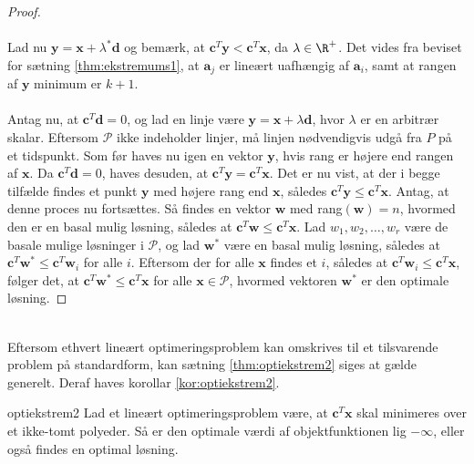 \begin{proof}
\\\\%
Lad nu $\textbf{y} = \textbf{x} + \lambda^* \textbf{d} $ og bemærk, at $ \textbf{c}^T \textbf{y} < \textbf{c}^T \textbf{x}$, da $ \lambda \in \R^+ $. 
Det vides fra beviset for sætning \ref{thm:ekstremums1}, at $\textbf{a}_j$ er lineært uafhængig af $\textbf{a}_i$, samt at rangen af $\textbf{y}$ minimum er $k + 1$. 
\\\\
%
Antag nu, at $\textbf{c}^T \textbf{d} = 0$, og lad en linje være $\textbf{y} = \textbf{x} + \lambda \textbf{d}$, hvor $ \lambda $ er en arbitrær skalar. 
Eftersom $\mathcal{P}$ ikke indeholder linjer, må linjen nødvendigvis udgå fra $P$ på et tidspunkt. 
Som før haves nu igen en vektor $\textbf{y}$, hvis rang er højere end rangen af $\textbf{x}$. 
Da $\textbf{c}^T \textbf{d} = 0$, haves desuden, at $\textbf{c}^T \textbf{y} = \textbf{c}^T \textbf{x}$. 
Det er nu vist, at der i begge tilfælde findes et punkt $\textbf{y}$ med højere rang end $\textbf{x}$, således $\textbf{c}^T \textbf{y} \leq \textbf{c}^T \textbf{x}$. 
Antag, at denne proces nu fortsættes.
Så findes en vektor $\textbf{w}$ med rang$(\textbf{w})=n$, hvormed den er en basal mulig løsning, således at $\textbf{c}^T \textbf{w} \leq \textbf{c}^T \textbf{x}$. 
Lad $w_1, w_2, \ldots , w_r$ være de basale mulige løsninger i $\mathcal{P}$, og lad $\textbf{w}^*$ være en basal mulig løsning, således at $\textbf{c}^T \textbf{w}^* \leq \textbf{c}^T \textbf{w}_i$ for alle $i$. 
Eftersom der for alle $\textbf{x}$ findes et $i$, således at $\textbf{c}^T \textbf{w}_i \leq \textbf{c}^T \textbf{x}$, følger det, at $\textbf{c}^T \textbf{w}^* \leq \textbf{c}^T \textbf{x}$ for alle $\textbf{x} \in \mathcal{P}$, hvormed vektoren $\textbf{w}^*$ er den optimale løsning. 
\end{proof}\\
%
Eftersom ethvert lineært optimeringsproblem kan omskrives til et tilsvarende problem på standardform, kan sætning \ref{thm:optiekstrem2} siges at gælde generelt. 
Deraf haves korollar \ref{kor:optiekstrem2}. 
%
\begin{kor}{}{optiekstrem2}
Lad et lineært optimeringsproblem være, at $\textbf{c}^T \textbf{x}$ skal minimeres over et ikke-tomt polyeder.
Så er den optimale værdi af objektfunktionen lig $- \infty$, eller også findes en optimal løsning. 
\end{kor}
%
%